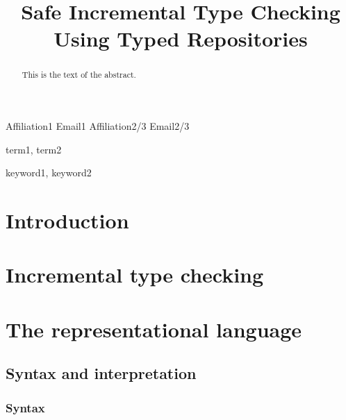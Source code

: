 \documentclass[9pt,authoryear]{sigplanconf}
\begin{document}
\copyrightdata{[to be supplied]} 


\title{Safe Incremental Type Checking Using Typed Repositories}

           {Affiliation1}
           {Email1}
           {Affiliation2/3}
           {Email2/3}

\maketitle

\begin{abstract}
This is the text of the abstract.
\end{abstract}


\terms
term1, term2

\keywords
keyword1, keyword2

\section{Introduction}

\section{Incremental type checking}

\section{The {\system} representational language}

\subsection{Syntax and interpretation}

\subsubsection{Syntax}
\end{document}
